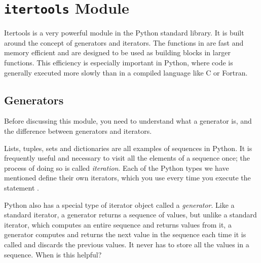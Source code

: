 \section*{\texttt{itertools} Module}
Itertools is a very powerful module in the Python standard library. It is built around the concept
of generators and iterators.  The functions in  are fast and memory efficient and are designed to be used as
building blocks in larger functions. 
This efficiency is especially important in Python, where code is generally executed more slowly than in a compiled language like C or Fortran.

\subsection*{Generators}
Before discussing this module, you need to understand what a generator is, and the difference between generators and iterators.

Lists, tuples, sets and dictionaries are all examples of sequences in Python. It is frequently useful and necessary to visit all the elements of a sequence once; the process of doing so is called \emph{iteration}.
Each of the Python types we have mentioned define their own iterators, which you use every time you execute the statement .

Python also has a special type of iterator object called a \emph{generator}.
Like a standard iterator, a generator returns a sequence of values, but unlike a standard iterator, which computes an entire sequence and returns values from it, a generator computes and returns the next value in the sequence each time it is called and discards the previous values. It never has to store all the values in a sequence. When is this helpful?

